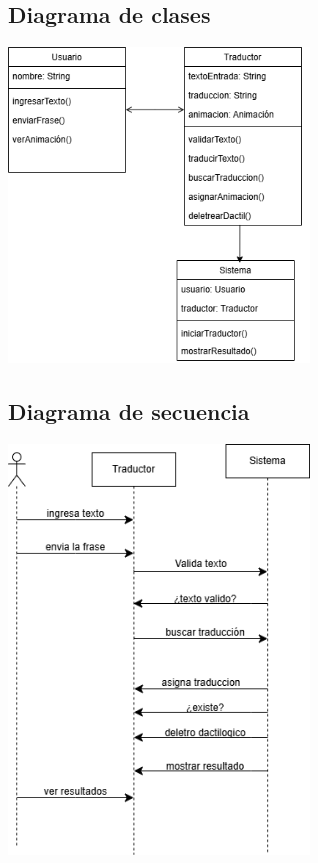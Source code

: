 \subsection{Diagrama de clases}
\begin{center}
    \includegraphics[width=0.6\textwidth]{Images/Cap 3/clases.png}
\end{center}

\subsection{Diagrama de secuencia}
\begin{center}
    \includegraphics[width=0.6\textwidth]{Images/Cap 3/secuencia.png}
\end{center}
